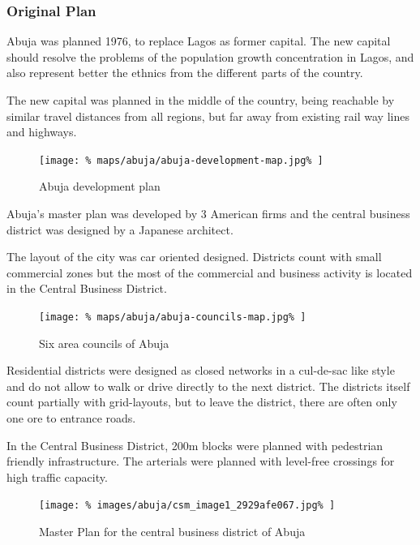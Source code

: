 \documentclass{article}
\begin{document}
	\begin{multicols}{2}		
		\raggedcolumns
				
			\subsubsection{Original Plan}			
			Abuja was planned 1976, to replace Lagos as former capital.
			The new capital should resolve the problems of the population growth concentration in Lagos, and also represent better the ethnics from the different parts of the country.
			
			The new capital was planned in the middle of the country, being reachable by similar travel distances from all regions, but far away from existing rail way lines and highways.
			
			\begin{figure}[H]
				\texttt{[image: \%
					maps/abuja/abuja-development-map.jpg\%
				]}
				\caption{Abuja development plan  \cite{NairalandForum:AbujaMap}}
				\label{fig:map:abuja-development-plan}
			\end{figure}
			
			Abuja's master plan was developed by 3 American firms and the central business district was designed by a Japanese architect.
			
			The layout of the city was car oriented designed. Districts count with small commercial zones but the most of the commercial and business activity is located in the Central Business District.
			
			\begin{figure}[H]
				\texttt{[image: \%
					maps/abuja/abuja-councils-map.jpg\%
				]}
				\caption{Six area councils of Abuja  \cite{ResearchGate:SixCouncils}}
				\label{fig:map:abuja-six-area-councils}
			\end{figure}
			
			Residential districts were designed as closed networks in a cul-de-sac like style and do not allow to walk or drive directly to the next district. The districts itself count partially with grid-layouts, but to leave the district, there are often only one ore to entrance roads.
			
			In the Central Business District, 200m blocks were planned with pedestrian friendly infrastructure.
			The arterials were planned with level-free crossings for high traffic capacity.
			
			\begin{figure}[H]
				\texttt{[image: \%
					images/abuja/csm\_image1\_2929afe067.jpg\%
				]}
				\caption{Master Plan for the central business district of Abuja \cite{ASplusP:MasterPlanReview}}
				\label{fig:map:abuja-master-plan-cbd}
			\end{figure}	
			

\end{multicols}
\end{document}
